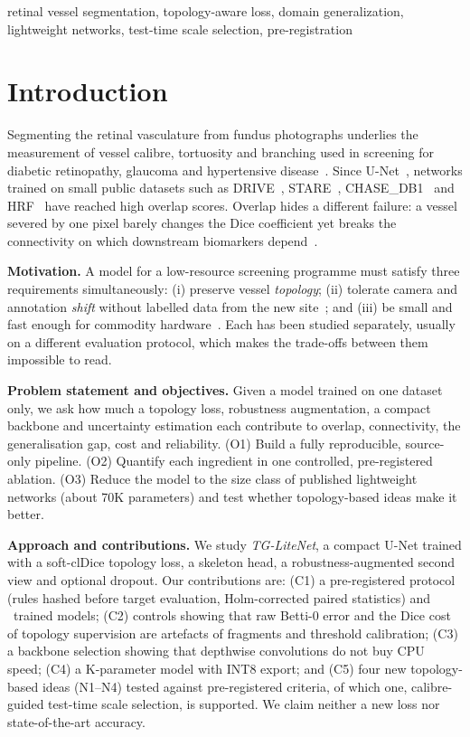 \documentclass[conference]{IEEEtran}
\begin{document}
\begin{IEEEkeywords}
retinal vessel segmentation, topology-aware loss, domain generalization, lightweight networks, test-time scale selection, pre-registration
\end{IEEEkeywords}

\section{Introduction}
Segmenting the retinal vasculature from fundus photographs underlies the measurement of vessel calibre, tortuosity and branching used in screening for diabetic retinopathy, glaucoma and hypertensive disease~\cite{liu2025review}. Since U-Net~\cite{ronneberger2015}, networks trained on small public datasets such as DRIVE~\cite{staal2004}, STARE~\cite{hoover2000}, CHASE\_DB1~\cite{fraz2012} and HRF~\cite{budai2013} have reached high overlap scores. Overlap hides a different failure: a vessel severed by one pixel barely changes the Dice coefficient yet breaks the connectivity on which downstream biomarkers depend~\cite{shit2021,shi2024,kirchhoff2024}.

\textbf{Motivation.} A model for a low-resource screening programme must satisfy three requirements simultaneously: (i) preserve vessel \emph{topology}; (ii) tolerate camera and annotation \emph{shift} without labelled data from the new site~\cite{galdran2022,fadugba2024}; and (iii) be small and fast enough for commodity hardware~\cite{zeng2025,sobhan2026}. Each has been studied separately, usually on a different evaluation protocol, which makes the trade-offs between them impossible to read.

\textbf{Problem statement and objectives.} Given a model trained on one dataset only, we ask how much a topology loss, robustness augmentation, a compact backbone and uncertainty estimation each contribute to overlap, connectivity, the generalisation gap, cost and reliability. (O1) Build a fully reproducible, source-only pipeline. (O2) Quantify each ingredient in one controlled, pre-registered ablation. (O3) Reduce the model to the size class of published lightweight networks (about 70K parameters) and test whether topology-based ideas make it better.

\textbf{Approach and contributions.} We study \emph{TG-LiteNet}, a compact U-Net trained with a soft-clDice topology loss, a skeleton head, a robustness-augmented second view and optional dropout. Our contributions are: (C1) a pre-registered protocol (rules hashed before target evaluation, Holm-corrected paired statistics) and \nTrainAll\ trained models; (C2) controls showing that raw Betti-0 error and the Dice cost of topology supervision are artefacts of fragments and threshold calibration; (C3) a backbone selection showing that depthwise convolutions do not buy CPU speed; (C4) a \hParamsK K-parameter model with INT8 export; and (C5) four new topology-based ideas (N1--N4) tested against pre-registered criteria, of which one, calibre-guided test-time scale selection, is supported. We claim neither a new loss nor state-of-the-art accuracy.
\end{document}
